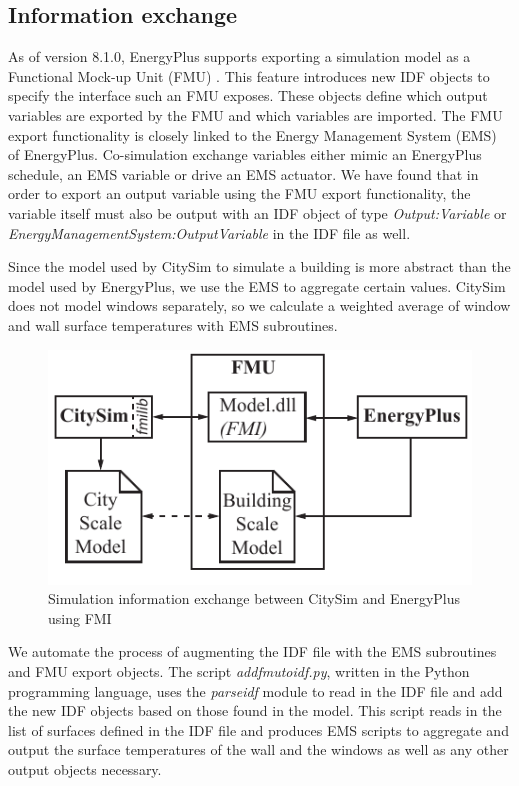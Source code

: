 \documentclass{tBPS2e}
\theoremstyle{plain}
\theoremstyle{definition}
\theoremstyle{remark}
\begin{document}
\subsection{Information exchange}
As of version 8.1.0, EnergyPlus supports exporting a simulation model as a
Functional Mock-up Unit (FMU) \citep{Nouidui:2014hq}. This feature introduces
new IDF objects to specify the interface such an FMU exposes. These objects
define which output variables are exported by the FMU and which variables are
imported. The FMU export functionality is closely linked to the Energy
Management System (EMS) of EnergyPlus. Co-simulation exchange variables either
mimic an EnergyPlus schedule, an EMS variable or drive an EMS actuator. We have
found that in order to export an output variable using the FMU export
functionality, the variable itself must also be output with an IDF object of
type \emph{Output:Variable} or \emph{EnergyManagementSystem:OutputVariable}
in the IDF file as well.

Since the model used by CitySim to simulate a building is more abstract than
the model used by EnergyPlus, we use the EMS to aggregate certain values.
CitySim does not model windows separately, so we calculate a weighted average
of window and wall surface temperatures with EMS subroutines.

\begin{figure}
\centering
\includegraphics[scale=1.0]{figures/UMEM_FMU_Overview}
\caption{Simulation information exchange between CitySim and EnergyPlus using FMI}
\label{fig:FMUOverview}
\end{figure}

We automate the process of augmenting the IDF file with the EMS subroutines and
FMU export objects. The script \emph{addfmutoidf.py}, written in the Python
programming language, uses the \emph{parseidf} module to read in the IDF file
and add the new IDF objects based on those found in the model.  This
script reads in the list of surfaces defined in the IDF file and produces EMS
scripts to aggregate and output the surface temperatures of the wall and the
windows as well as any other output objects necessary.
\end{document}
